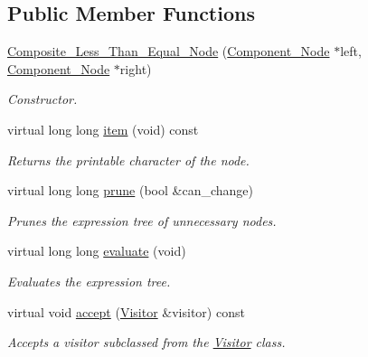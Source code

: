 \subsection*{Public Member Functions}
\begin{DoxyCompactItemize}
\item 
\hyperlink{classMadara_1_1Expression__Tree_1_1Composite__Less__Than__Equal__Node_acb03409744b50531e71a9c64447ea69f}{Composite\_\-Less\_\-Than\_\-Equal\_\-Node} (\hyperlink{classMadara_1_1Expression__Tree_1_1Component__Node}{Component\_\-Node} $\ast$left, \hyperlink{classMadara_1_1Expression__Tree_1_1Component__Node}{Component\_\-Node} $\ast$right)
\begin{DoxyCompactList}\small\item\em Constructor. \item\end{DoxyCompactList}\item 
virtual long long \hyperlink{classMadara_1_1Expression__Tree_1_1Composite__Less__Than__Equal__Node_aff89f3a5409704d549e09c9fcf6d7961}{item} (void) const 
\begin{DoxyCompactList}\small\item\em Returns the printable character of the node. \item\end{DoxyCompactList}\item 
virtual long long \hyperlink{classMadara_1_1Expression__Tree_1_1Composite__Less__Than__Equal__Node_a429febd1284c14f39a49ebf5406bba1e}{prune} (bool \&can\_\-change)
\begin{DoxyCompactList}\small\item\em Prunes the expression tree of unnecessary nodes. \item\end{DoxyCompactList}\item 
virtual long long \hyperlink{classMadara_1_1Expression__Tree_1_1Composite__Less__Than__Equal__Node_aaab05400e30f24c86075d809c33021cb}{evaluate} (void)
\begin{DoxyCompactList}\small\item\em Evaluates the expression tree. \item\end{DoxyCompactList}\item 
virtual void \hyperlink{classMadara_1_1Expression__Tree_1_1Composite__Less__Than__Equal__Node_ac2f05f3c1b8fc7e9cb49e35caf1364d0}{accept} (\hyperlink{classMadara_1_1Expression__Tree_1_1Visitor}{Visitor} \&visitor) const 
\begin{DoxyCompactList}\small\item\em Accepts a visitor subclassed from the \hyperlink{classMadara_1_1Expression__Tree_1_1Visitor}{Visitor} class. \item\end{DoxyCompactList}\item 

\end{DoxyCompactItemize}
